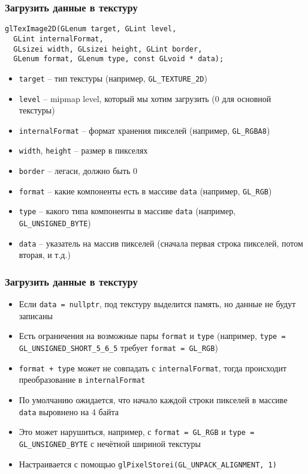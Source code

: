 \documentclass{beamer}
\begin{document}
\begin{frame}[fragile]
\frametitle{Загрузить данные в текстуру}
\begin{verbatim}
glTexImage2D(GLenum target, GLint level,
  GLint internalFormat,
  GLsizei width, GLsizei height, GLint border,
  GLenum format, GLenum type, const GLvoid * data);
\end{verbatim}
\begin{itemize}
\item \verb|target| -- тип текстуры (например, \verb|GL_TEXTURE_2D|)
\item \verb|level| -- mipmap level, который мы хотим загрузить (0 для основной текстуры)
\item \verb|internalFormat| -- формат хранения пикселей (например, \verb|GL_RGBA8|)
\item \verb|width|, \verb|height| -- размер в пикселях
\item \verb|border| -- легаси, должно быть 0
\item \verb|format| -- какие компоненты есть в массиве \verb|data| (например, \verb|GL_RGB|)
\item \verb|type| -- какого типа компоненты в массиве \verb|data| (например, \verb|GL_UNSIGNED_BYTE|)
\item \verb|data| -- указатель на массив пикселей (сначала первая строка пикселей, потом вторая, и т.д.)
\end{itemize}
\end{frame}

\begin{frame}[fragile]
\frametitle{Загрузить данные в текстуру}
\begin{itemize}
\item Если \verb|data = nullptr|, под текстуру выделится память, но данные не будут записаны
\pause
\item Есть ограничения на возможные пары \verb|format| и \verb|type| (например, \verb|type = GL_UNSIGNED_SHORT_5_6_5| требует \verb|format = GL_RGB|)
\pause
\item \verb|format + type| может не совпадать с \verb|internalFormat|, тогда происходит преобразование в \verb|internalFormat|
\pause
\item По умолчанию ожидается, что начало каждой строки пикселей в массиве \verb|data| выровнено на 4 байта
\item Это может нарушиться, например, с \verb|format = GL_RGB| и \verb|type = GL_UNSIGNED_BYTE| с нечётной шириной текстуры
\item Настраивается с помощью \verb|glPixelStorei(GL_UNPACK_ALIGNMENT, 1)|
\end{itemize}
\end{frame}
\end{document}
